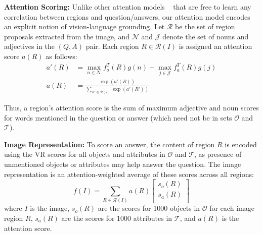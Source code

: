 \documentclass[10pt,twocolumn,letterpaper]{article}
\newcommand\boldhead[1]{\vspace{0.03in}\noindent\textbf{#1: }}
\begin{document}
\boldhead{Attention Scoring}\label{sec:relevance} Unlike other attention models ~\cite{yang2015stacked,lu2016hierarchical} that are free to learn any correlation between regions and question/answers, our attention model encodes an explicit notion of vision-language grounding.  Let $\mathcal{R}$ be the set of region proposals extracted from the image, and $\mathcal{N}$ and $\mathcal{J}$ denote the set of nouns and adjectives in the $(Q,A)$ pair. Each region $R\in \mathcal{R}(I)$ is assigned an attention score $a(R)$ as follows:\\
\vspace{-5mm}
\begin{align}
a'(R) &= \max_{n \in \mathcal{N}} f_o^T(R)g(n) + \max_{j \in \mathcal{J}} f_a^T(R)g(j) \label{eqn:relevance_unnormalized}\\
a(R)&= \frac{\exp(a'(R))}{\sum_{R' \in \mathcal{R}(I)}\exp(a'(R'))}
\label{eqn:relevance}
\end{align}

Thus, a region's attention score is the sum of maximum adjective and noun scores for words mentioned in the question or answer (which need not be in sets $\mathcal{O}$  and $\mathcal{T}$).   


\boldhead{Image Representation} To score an answer, the content of region $R$ is encoded using the VR scores for all objects and attributes in $\mathcal{O}$ and $\mathcal{T}$, as presence of unmentioned objects or attributes may help answer the question. The image representation is an attention-weighted average of these scores across all regions: 
\begin{equation}
f(I) = \sum_{R\in\mathcal{R}(I)}a(R)
\begin{bmatrix}
s_o(R) \\
s_a(R) \\
\end{bmatrix}
\label{eqn:weightedvisualfeats}
\end{equation}
where $I$ is the image, $s_o(R)$ are the scores for 1000 objects in $\mathcal{O}$ for each image region $R$, $s_a(R)$ are the scores for 1000 attributes in $\mathcal{T}$, and $a(R)$ is the attention score.
\end{document}
